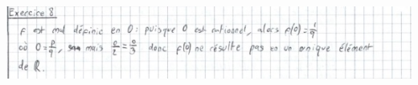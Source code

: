 \documentclass[a4paper, 10pt]{report}
\begin{document}
	\includegraphics{ex08.jpg}
	
%	
%	
%	
	
\end{document}
